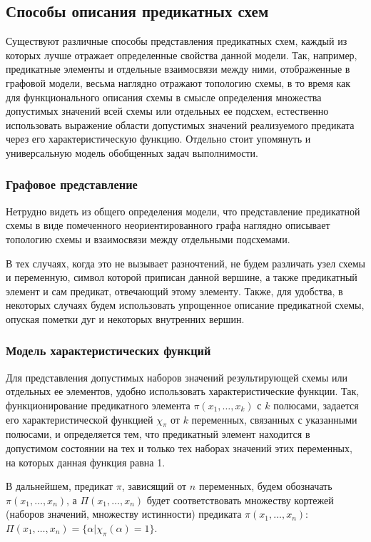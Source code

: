 \documentclass[12pt]{extarticle}
\begin{document}
\subsection{Способы описания предикатных схем}
Существуют различные способы представления предикатных схем, каждый из которых лучше отражает определенные свойства данной 
модели. Так, например, предикатные элементы и отдельные взаимосвязи между ними, отображенные в графовой модели,
весьма наглядно отражают топологию схемы, в то время как для функционального описания схемы в смысле 
определения множества допустимых значений 
всей схемы или отдельных ее подсхем, естественно использовать выражение 
области допустимых значений реализуемого предиката через его характеристическую функцию. 
Отдельно стоит упомянуть и универсальную модель обобщенных задач выполнимости.

\subsubsection*{Графовое представление}

Нетрудно видеть из общего определения модели,
что представление предикатной схемы в виде помеченного неориентированного графа 
наглядно описывает топологию схемы и взаимосвязи 
между отдельными подсхемами.

В тех случаях, когда это не вызывает разночтений, не будем различать узел схемы и переменную, 
символ которой приписан данной вершине, а также предикатный элемент и сам предикат, отвечающий этому элементу. 
Также, для удобства, в некоторых случаях будем использовать упрощенное описание предикатной схемы, 
опуская пометки дуг и некоторых внутренних вершин.  

\subsubsection*{Модель характеристических функций}

Для представления допустимых наборов значений результирующей схемы или отдельных ее элементов, 
удобно использовать характеристические
функции. Так, функционирование предикатного элемента $\pi(x_1, \dots, x_k)$ с $k$ полюсами,
задается его характеристической функцией $\chi_{\pi}$ от $k$ переменных, 
связанных с указанными полюсами, и определяется тем, что предикатный элемент находится в допустимом состоянии на тех и 
только тех наборах значений этих переменных, на которых данная функция равна 1. 

В дальнейшем, предикат $\pi$, зависящий от $n$ переменных, будем обозначать $\pi(x_1, \dots, x_n)$, а 
$\Pi(x_1, \dots, x_n)$ будет соответствовать множеству кортежей (наборов значений, множеству истинности) 
предиката $\pi(x_1, \dots, x_n)$: $\Pi(x_1, \dots, x_n) = \{ \alpha | \chi_{\pi}(\alpha) = 1 \}$.
\end{document}
